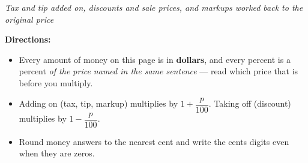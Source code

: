 \documentclass[12pt]{article}
\begin{document}

\begin{center}
\textit{Tax and tip added on, discounts and sale prices, and markups worked back
to the original price}
\end{center}

\noindent\textbf{Directions:}
\begin{itemize}
  \item Every amount of money on this page is in \textbf{dollars}, and every
        percent is a percent \emph{of the price named in the same sentence} ---
        read which price that is before you multiply.
  \item Adding on (tax, tip, markup) multiplies by $1 + \dfrac{p}{100}$. Taking
        off (discount) multiplies by $1 - \dfrac{p}{100}$.
  \item Round money answers to the nearest cent and write the cents digits even
        when they are zeros.
\end{itemize}



\end{document}
